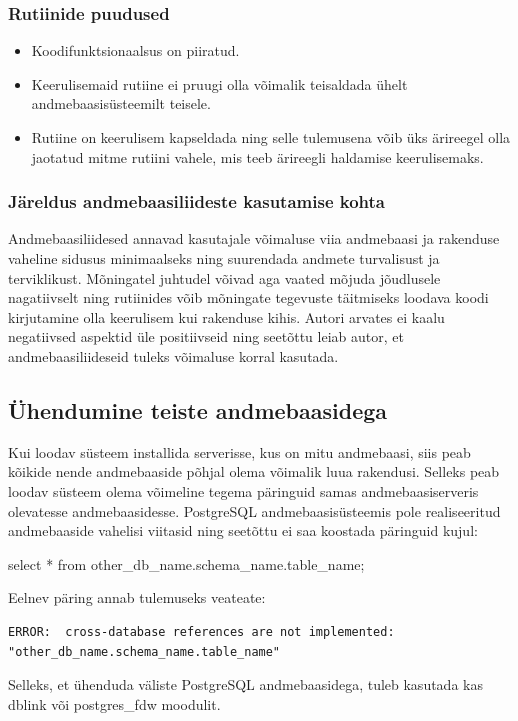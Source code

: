 \documentclass[a4paper,12pt]{article} %
\begin{document}
\subsubsection{Rutiinide puudused}
\begin{itemize}
\item Koodifunktsionaalsus on piiratud.
\item Keerulisemaid rutiine ei pruugi olla võimalik teisaldada ühelt andmebaasisüsteemilt teisele.
\item Rutiine on keerulisem kapseldada ning selle tulemusena võib üks ärireegel olla jaotatud mitme rutiini vahele, mis teeb ärireegli haldamise keerulisemaks.
\end{itemize}
\cite{StoredProcProsAndCons}

\subsubsection{Järeldus andmebaasiliideste kasutamise kohta}
Andmebaasiliidesed annavad kasutajale võimaluse viia andmebaasi ja rakenduse vaheline sidusus minimaalseks ning suurendada andmete turvalisust ja terviklikust. Mõningatel juhtudel võivad aga vaated mõjuda jõudlusele nagatiivselt ning rutiinides võib mõningate tegevuste täitmiseks loodava koodi kirjutamine olla keerulisem kui rakenduse kihis. Autori arvates ei kaalu negatiivsed aspektid üle positiivseid ning seetõttu leiab autor, et andmebaasiliideseid tuleks võimaluse korral kasutada.

\subsection{Ühendumine teiste andmebaasidega}
Kui loodav süsteem installida serverisse, kus on mitu andmebaasi, siis  peab kõikide nende andmebaaside põhjal olema võimalik luua rakendusi. Selleks peab loodav süsteem olema võimeline tegema päringuid samas andmebaasiserveris olevatesse andmebaasidesse. PostgreSQL andmebaasisüsteemis pole realiseeritud andmebaaside vahelisi viitasid ning seetõttu ei saa koostada päringuid kujul:
\begin{SQL}
select * from other_db_name.schema_name.table_name;
\end{SQL}
Eelnev päring annab tulemuseks veateate:
\begin{lstlisting}
ERROR:  cross-database references are not implemented: "other_db_name.schema_name.table_name"
\end{lstlisting}
Selleks, et ühenduda väliste PostgreSQL andmebaasidega, tuleb kasutada kas dblink või postgres\_fdw moodulit.
\end{document}
